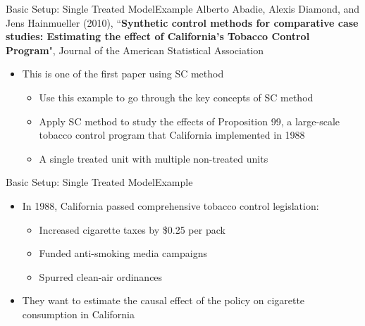 \documentclass[hyperref={pdfpagelabels=false}]{beamer}
\begin{document}
\begin{frame}{Basic Setup: Single Treated Model}{Example}
Alberto Abadie, Alexis Diamond, and Jens Hainmueller (2010), ``\textbf{Synthetic control methods for comparative case studies: Estimating the effect of California's Tobacco Control Program}", Journal of the American Statistical Association	
\begin{itemize}
\vspace{0.2cm}
\item This is one of the first paper using SC method
\vspace{0.2cm}
\begin{itemize}
\item Use this example to go through the key concepts of SC method	
	\vspace{0.2cm}
\item Apply SC method to study the effects of Proposition 99, a large-scale tobacco control program that California implemented in 1988	
\vspace{0.2cm}	
\item A single treated unit with multiple non-treated units		
\end{itemize}	

\end{itemize}
\end{frame}



\begin{frame}{Basic Setup: Single Treated Model}{Example}
\begin{itemize}
\item In 1988, California passed comprehensive tobacco control legislation:
\begin{itemize}
\vspace{0.2cm}
\item Increased cigarette taxes by \$0.25 per pack
\vspace{0.2cm}
\item Funded anti-smoking media campaigns
\vspace{0.2cm}
\item Spurred clean-air ordinances
\end{itemize}
\vspace{0.2cm}
\item They want to estimate the causal effect of the policy on cigarette consumption in California
\end{itemize}
\end{frame}
\end{document}
